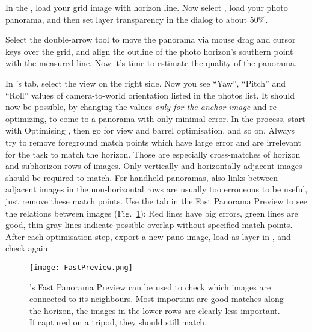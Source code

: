 In the , load your grid image with horizon line.  Now
select , load your photo panorama,
and then set layer transparency in the  dialog to about
50\%.

Select the double-arrow tool to move the panorama via mouse drag and
cursor keys over the grid, and align the outline of the photo
horizon's southern point with the measured line. Now it's time to
estimate the quality of the panorama.

In 's  tab, select the  view on
the right side. Now you see ``Yaw'', ``Pitch'' and ``Roll'' values of
camera-to-world orientation listed in the photos list. It should now
be possible, by changing the values \emph{only for the anchor image}
and re-optimizing, to come to a panorama with only minimal error. In
the process, start with Optimising , then go for view and barrel optimisation, and so on. Always
try to remove foreground match points which have large error and are irrelevant
for the task to match the horizon. Those are especially cross-matches
of horizon and subhorizon rows of images. Only vertically and
horizontally adjacent images should be required to match. For handheld
panoramas, also links between adjacent images in the non-horizontal rows are usually
too erroneous to be useful, just remove these match points. Use the
 tab in the Fast Panorama Preview to see the relations
between images (Fig.~\ref{fig:FastPanoPreview}): Red lines have big
errors, green lines are good, thin gray lines indicate possible
overlap without specified match points. After each optimisation step,
export a new pano image, load as layer in , and check
again.

\begin{figure}[tb]
  \centering
    \texttt{[image: FastPreview.png]}
    \caption{'s Fast Panorama Preview can be used to check which
      images are connected to its neighbours. Most important are good
      matches along the horizon, the images in the lower rows are
      clearly less important. If captured on a tripod, they should
      still match. }
  \label{fig:FastPanoPreview}
\end{figure}


\noindent
\colorbox{light-gray}{}




